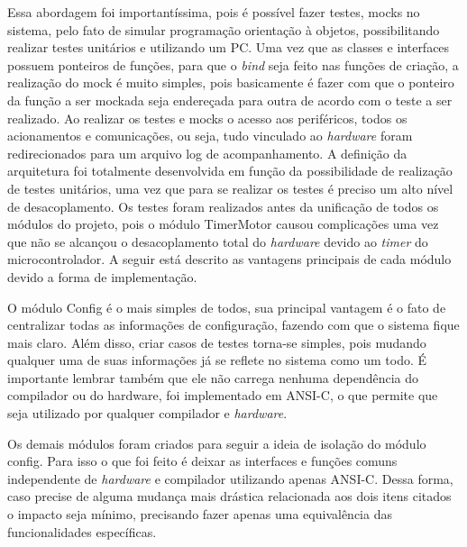 Essa abordagem foi importantíssima, pois é possível fazer testes, mocks no sistema, pelo fato de simular programação orientação à objetos, possibilitando realizar testes unitários e utilizando um PC. Uma vez que as classes e interfaces possuem ponteiros de funções, para que o \emph{bind} seja feito nas funções de criação, a realização do mock é muito simples, pois basicamente é fazer com que o ponteiro da função a ser mockada seja endereçada para outra de acordo com o teste a ser realizado. Ao realizar os testes e mocks o acesso aos periféricos, todos os acionamentos e comunicações, ou seja, tudo vinculado ao \emph{hardware} foram redirecionados para um arquivo log de acompanhamento. A definição da arquitetura foi totalmente desenvolvida em função da possibilidade de realização de testes unitários, uma vez que para se realizar os testes é preciso um alto nível de desacoplamento. Os testes foram realizados antes da unificação de todos os módulos do projeto, pois o módulo TimerMotor causou complicações uma vez que não se alcançou o desacoplamento total do \emph{hardware} devido ao \emph{timer} do microcontrolador. A seguir está descrito as vantagens principais de cada módulo devido a forma de implementação.

O módulo Config é o mais simples de todos, sua principal vantagem é o fato de centralizar todas as informações de configuração, fazendo com que o sistema fique mais claro. Além disso, criar casos de testes torna-se simples, pois mudando qualquer uma de suas informações já se reflete no sistema como um todo. É importante lembrar também que ele não carrega nenhuma dependência do compilador ou do hardware, foi implementado em ANSI-C, o que permite que seja utilizado por qualquer compilador e \emph{hardware}.

Os demais módulos foram criados para seguir a ideia de isolação do módulo config. Para isso o que foi feito é deixar as interfaces e funções comuns independente de \emph{hardware} e compilador utilizando apenas ANSI-C. Dessa forma, caso precise de alguma mudança mais drástica relacionada aos dois itens citados o impacto seja mínimo, precisando fazer apenas uma equivalência das funcionalidades específicas. 

